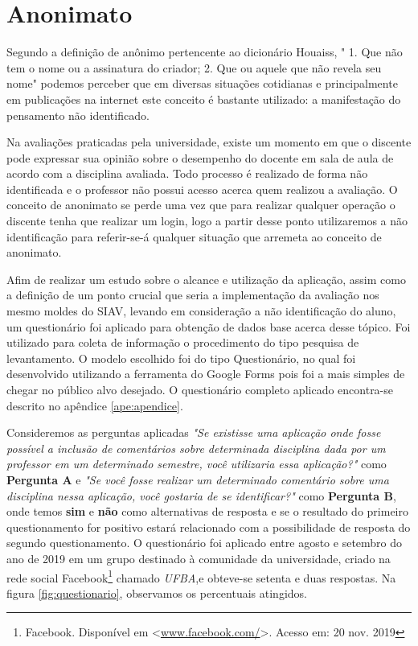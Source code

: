 \documentclass[12pt, a4paper]{report}
\begin{document}
\section{ Anonimato}

Segundo a definição de anônimo pertencente ao dicionário Houaiss, " 1. Que não tem o nome ou a assinatura do criador; 2. Que ou aquele que não revela seu nome" \cite[p. 7]{houasis2001} podemos perceber que em diversas situações cotidianas e principalmente em publicações na internet este conceito é bastante utilizado: a manifestação do pensamento não identificado.

Na avaliações praticadas pela universidade, existe um momento em que o discente pode expressar sua opinião sobre o desempenho do docente em sala de aula de acordo com a disciplina avaliada. Todo processo é realizado de forma não identificada e o professor não possui acesso acerca quem realizou a avaliação. O conceito de anonimato se perde uma vez que para realizar qualquer operação o discente tenha que realizar um login, logo a partir desse ponto utilizaremos a não identificação para referir-se-á qualquer situação que arremeta ao conceito de anonimato.

Afim de realizar um estudo sobre o alcance e utilização da aplicação, assim como a definição de um ponto crucial que seria a implementação da avaliação nos mesmo moldes do \ac{SIAV}, levando em consideração a não identificação do aluno, um questionário foi aplicado para obtenção de dados base acerca desse tópico. %
Foi utilizado para coleta de informação o procedimento do tipo pesquisa de levantamento. O modelo escolhido foi do tipo Questionário, no qual foi desenvolvido utilizando a ferramenta do Google Forms pois foi a mais simples de chegar no público alvo desejado. O questionário completo aplicado encontra-se descrito no apêndice \ref{ape:apendice}.

Consideremos as perguntas aplicadas \textit{"Se existisse uma aplicação onde fosse possível a inclusão de comentários sobre determinada disciplina dada por um professor em um determinado semestre, você utilizaria essa aplicação?"} como \textbf{Pergunta A} e \textit{ 
"Se você fosse realizar um determinado comentário sobre uma disciplina nessa aplicação, você gostaria de se identificar?"} como \textbf{Pergunta B}, onde temos \textbf{sim} e \textbf{não} como alternativas de resposta e se o resultado do primeiro  questionamento for positivo estará relacionado com a possibilidade de resposta do segundo questionamento. O questionário foi aplicado entre agosto e setembro do ano de 2019 em um grupo destinado à comunidade da universidade, criado na rede social Facebook\footnote{Facebook. Disponível em <\url{www.facebook.com/}>. Acesso em: 20 nov. 2019} chamado \textit{UFBA},e obteve-se setenta e duas respostas. Na figura \ref{fig:questionario}, observamos os percentuais atingidos.
\end{document}
